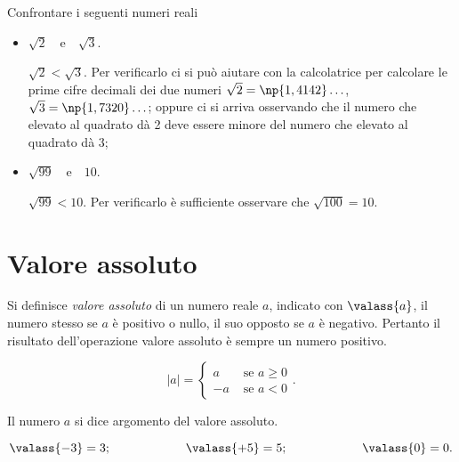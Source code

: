 \pagebreak
\begin{exrig}
 \begin{esempio}
 Confrontare i seguenti numeri reali
 \begin{itemize}
 \item $\sqrt{2}$~~e~~$\sqrt{3}$.
 
 $\sqrt{2}<\sqrt{3}$. Per verificarlo ci si può aiutare con la calcolatrice per calcolare le prime cifre decimali dei due numeri $\sqrt{2}=\np{1,4142}\ldots$, $\sqrt{3}=\np{1,7320}\ldots$; oppure ci si arriva osservando che il numero che elevato al quadrato dà 2 deve essere minore del numero che elevato al quadrato dà 3;
 \item $\sqrt{99}$~~e~~$10$.
 
 $\sqrt{99}<10$. Per verificarlo è sufficiente osservare che $\sqrt{100}=10$.
 \end{itemize}
 \end{esempio}
\end{exrig}
\ovalbox{\risolvii \ref{ese:1.2}, \ref{ese:1.3}, \ref{ese:1.4}, \ref{ese:1.5}, \ref{ese:1.6}}\vspazio

\section{Valore assoluto}

Si definisce \emph{valore assoluto} di un numero reale $a$, indicato con $\valass{a}$, il numero stesso se $a$ è positivo o nullo, il suo opposto se $a$ è negativo. Pertanto il risultato dell'operazione valore assoluto è sempre un numero positivo.

\[
|a|=
\begin{cases}
a & \text{ se }a\ge 0\\
-a & \text{ se }a<0
\end{cases}.
\]

Il numero $a$ si dice argomento del valore assoluto.

\[\valass{-3}=3;\qquad\qquad\qquad\valass{+5}=5;\qquad\qquad\qquad\valass{0}=0.\]

